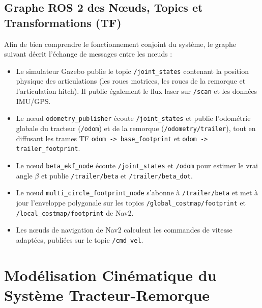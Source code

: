 \documentclass[12pt,a4paper,openany]{report}
\begin{document}
\section{Graphe ROS 2 des Nœuds, Topics et Transformations (TF)}
Afin de bien comprendre le fonctionnement conjoint du système, le graphe suivant décrit l'échange de messages entre les nœuds :
\begin{itemize}
    \item Le simulateur Gazebo publie le topic \texttt{/joint\_states} contenant la position physique des articulations (les roues motrices, les roues de la remorque et l'articulation hitch). Il publie également le flux laser sur \texttt{/scan} et les données IMU/GPS.
    \item Le nœud \texttt{odometry\_publisher} écoute \texttt{/joint\_states} et publie l'odométrie globale du tracteur (\texttt{/odom}) et de la remorque (\texttt{/odometry/trailer}), tout en diffusant les trames TF \texttt{odom -> base\_footprint} et \texttt{odom -> trailer\_footprint}.
    \item Le nœud \texttt{beta\_ekf\_node} écoute \texttt{/joint\_states} et \texttt{/odom} pour estimer le vrai angle $\beta$ et publie \texttt{/trailer/beta} et \texttt{/trailer/beta\_dot}.
    \item Le nœud \texttt{multi\_circle\_footprint\_node} s'abonne à \texttt{/trailer/beta} et met à jour l'enveloppe polygonale sur les topics \texttt{/global\_costmap/footprint} et \texttt{/local\_costmap/footprint} de Nav2.
    \item Les nœuds de navigation de Nav2 calculent les commandes de vitesse adaptées, publiées sur le topic \texttt{/cmd\_vel}.
\end{itemize}

\chapter{Modélisation Cinématique du Système Tracteur-Remorque} \label{ch:model}
\end{document}
